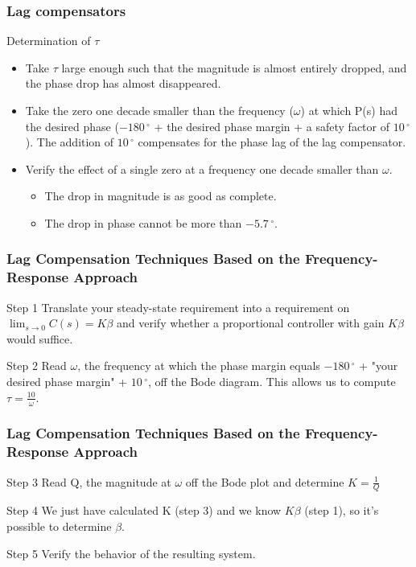 \begin{frame}
	\frametitle{Lag compensators}
	\begin{block}{Determination of $\tau$}
	\begin{itemize}
	\item Take $\tau$ large enough such that the magnitude is almost entirely dropped, and the phase drop has almost disappeared.
	\item Take the zero one decade smaller than the frequency ($\omega$) at which P(s) had the desired phase ($-180\,^{\circ}$ + the desired phase margin + a safety factor of $10\,^{\circ}$). The addition of $10\,^{\circ}$ compensates for the phase lag of the lag compensator.
	\item Verify the effect of a single zero at a frequency one decade smaller than $\omega$.
	\begin{itemize}
	\item The drop in magnitude is as good as complete.
	\item The drop in phase cannot be more than $-5.7\,^{\circ}$.
	\end{itemize}
	\end{itemize}
	\end{block}
\end{frame}

\begin{frame}
\frametitle{Lag Compensation Techniques Based on the Frequency-Response Approach}
\begin{block}{Step 1}
	Translate your steady-state requirement into a requirement on $\lim_{s \to 0}C(s) = K\beta$ and verify whether a proportional controller with gain $K\beta$ would suffice.
\end{block}
\begin{block}{Step 2}
	Read $\omega$, the frequency at which the phase margin equals $-180\,^{\circ}$ + "your desired phase margin" + $10\,^{\circ}$, off the Bode diagram. This allows us to compute $\tau = \frac{10}{\omega}$. 
\end{block}
\end{frame}

\begin{frame}
	\frametitle{Lag Compensation Techniques Based on the Frequency-Response Approach}
	\begin{block}{Step 3}
	Read Q, the magnitude at $\omega$ off the Bode plot and determine $K = \frac{1}{Q}$
	\end{block}
	\begin{block}{Step 4}
	We just have calculated K (step 3) and we know $K\beta$ (step 1), so it's possible to determine $\beta$.
	\end{block}
	\begin{block}{Step 5}
		Verify the behavior of the resulting system.
	\end{block}
\end{frame}











